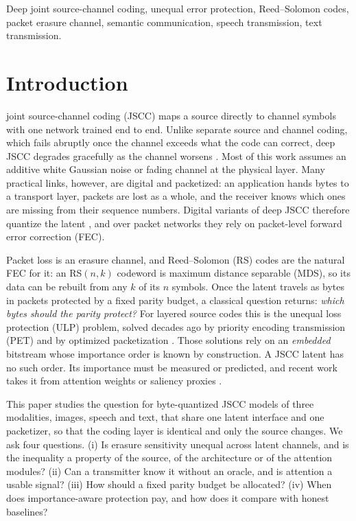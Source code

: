 \documentclass[journal]{IEEEtran}
\begin{document}
\begin{IEEEkeywords}
Deep joint source-channel coding, unequal error protection, Reed--Solomon codes, packet erasure channel,
semantic communication, speech transmission, text transmission.
\end{IEEEkeywords}

\section{Introduction}
 joint source-channel coding (JSCC) maps a source directly to channel symbols with
one network trained end to end. Unlike separate source and channel coding, which fails abruptly once the
channel exceeds what the code can correct, deep JSCC degrades gracefully as the channel worsens
\cite{bourtsoulatze2019deep}. Most of this work assumes an additive white Gaussian noise or fading
channel at the physical layer. Many practical links, however, are digital and packetized: an
application hands bytes to a transport layer, packets are lost as a whole, and the receiver knows which
ones are missing from their sequence numbers. Digital variants of deep JSCC therefore quantize the latent
\cite{tung2022deepjsccq,esfahanizadeh2026block}, and over packet networks they rely on packet-level
forward error correction (FEC).

Packet loss is an erasure channel, and Reed--Solomon (RS) codes are the natural FEC for it: an RS$(n,k)$
codeword is maximum distance separable (MDS), so its data can be rebuilt from any $k$ of its $n$
symbols. Once the latent travels as bytes in packets protected by a fixed parity budget, a classical
question returns: \emph{which bytes should the parity protect?} For layered source codes this is the
unequal loss protection (ULP) problem, solved decades ago by priority encoding transmission (PET)
\cite{albanese1996pet} and by optimized packetization \cite{mohr2000ulp,dumitrescu2004optimal,
hamzaoui2005optimized}. Those solutions rely on an \emph{embedded} bitstream whose importance order is
known by construction. A JSCC latent has no such order. Its importance must be measured or predicted,
and recent work takes it from attention weights or saliency proxies \cite{bajic2021collaborative,
uyanik2023gradfec,zhan2026isfr}.

This paper studies the question for byte-quantized JSCC models of three modalities, images, speech and
text, that share one latent interface and one packetizer, so that the coding layer is identical and only
the source changes. We ask four questions. (i) Is erasure sensitivity unequal across latent channels, and
is the inequality a property of the source, of the architecture or of the attention modules? (ii) Can a
transmitter know it without an oracle, and is attention a usable signal? (iii) How should a fixed parity
budget be allocated? (iv) When does importance-aware protection pay, and how does it compare with honest
baselines?
\end{document}
